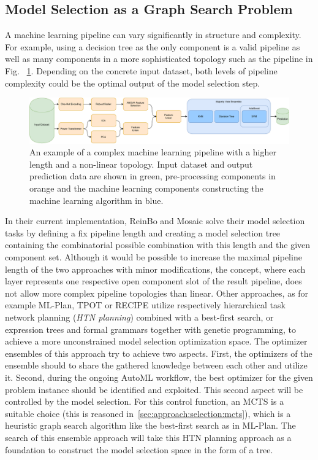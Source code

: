 \subsection{Model Selection as a Graph Search Problem}
\label{sec:approach:selection:search}
A machine learning pipeline can vary significantly in structure and complexity.
For example, using a decision tree as the only component is a valid pipeline as well as many components in a more sophisticated topology such as the pipeline in Fig. ~\ref{fig:approach:complex-pipeline}.
Depending on the concrete input dataset, both levels of pipeline complexity could be the optimal output of the model selection step.
\begin{figure}[ht!]
    \centering
    \includegraphics[width=\textwidth]{gfx/Figures/Approach/ComplexPipeline.pdf}
    \caption[An example of a complex machine learning pipeline with an increased length and a non-linear topology.]{An example of a complex machine learning pipeline with a higher length and a non-linear topology. Input dataset and output prediction data are shown in green, pre-processing components in orange and the machine learning components constructing the machine learning algorithm in blue.}
    \label{fig:approach:complex-pipeline}
\end{figure}

In their current implementation, ReinBo and Mosaic solve their model selection tasks by defining a fix pipeline length and creating a model selection tree containing the combinatorial possible combination with this length and the given component set. 
Although it would be possible to increase the maximal pipeline length of the two approaches with minor modifications, the concept, where each layer represents one respective open component slot of the result pipeline, does not allow more complex pipeline topologies than linear.\newline
Other approaches, as for example ML-Plan, TPOT or RECIPE utilize respectively hierarchical task network planning (\textit{HTN planning}) combined with a best-first search, or expression trees and formal grammars together with genetic programming, to achieve a more unconstrained model selection optimization space.
The optimizer ensembles of this approach try to achieve two aspects.
First, the optimizers of the ensemble should to share the gathered knowledge between each other and utilize it.
Second, during the ongoing AutoML workflow, the best optimizer for the given problem instance should be identified and exploited.
This second aspect will be controlled by the model selection. 
For this control function, an MCTS is a suitable choice (this is reasoned in~\ref{sec:approach:selection:mcts}), which is a heuristic graph search algorithm like the best-first search as in ML-Plan.
The search of this ensemble approach will take this HTN planning approach as a foundation to construct the model selection space in the form of a tree.

